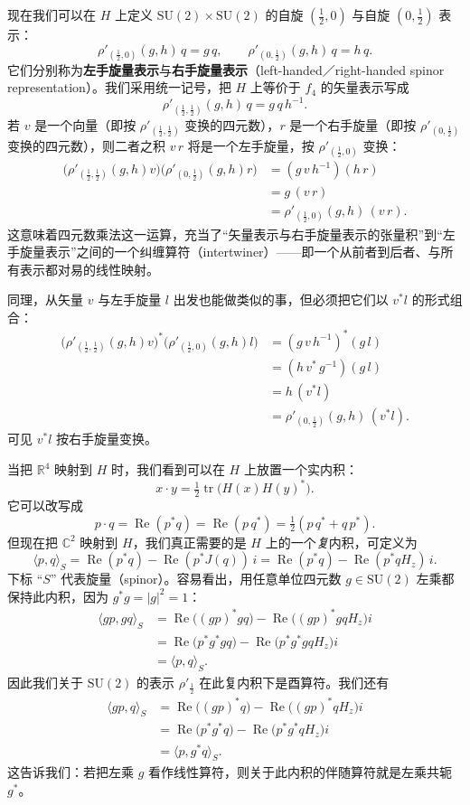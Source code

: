 现在我们可以在 $H$ 上定义 $\mathrm{SU}(2)\times\mathrm{SU}(2)$ 的自旋 $(\tfrac12,0)$ 与自旋 $(0,\tfrac12)$ 表示：
\[
\rho'_{(\frac12,0)}(g,h)\,q=g\,q,\qquad
\rho'_{(0,\frac12)}(g,h)\,q=h\,q .
\]
它们分别称为\textbf{左手旋量表示}与\textbf{右手旋量表示}（left-handed／right-handed spinor representation）。我们采用统一记号，把 $H$ 上等价于 $f_4$ 的矢量表示写成
\[
\rho'_{(\frac12,\frac12)}(g,h)\,q=g\,q\,h^{-1}.
\]
若 $v$ 是一个向量（即按 $\rho'_{(\frac12,\frac12)}$ 变换的四元数），$r$ 是一个右手旋量（即按 $\rho'_{(0,\frac12)}$ 变换的四元数），则二者之积 $v\,r$ 将是一个左手旋量，按 $\rho'_{(\frac12,0)}$ 变换：
\begin{align*}
\big(\rho'_{(\frac12,\frac12)}(g,h)v\big)\big(\rho'_{(0,\frac12)}(g,h)r\big)
&=(g\,v\,h^{-1})(h\,r)\\
&=g\,(v\,r)\\
&=\rho'_{(\frac12,0)}(g,h)\,(v\,r).
\end{align*}
这意味着四元数乘法这一运算，充当了“矢量表示与右手旋量表示的张量积”到“左手旋量表示”之间的一个纠缠算符（intertwiner）——即一个从前者到后者、与所有表示都对易的线性映射。

同理，从矢量 $v$ 与左手旋量 $l$ 出发也能做类似的事，但必须把它们以 $v^* l$ 的形式组合：
\begin{align*}
\big(\rho'_{(\frac12,\frac12)}(g,h)v\big)^*\big(\rho'_{(\frac12,0)}(g,h)l\big)
&=(g\,v\,h^{-1})^*(g\,l)\\
&=(h\,v^*\,g^{-1})(g\,l)\\
&=h\,(v^* l)\\
&=\rho'_{(0,\frac12)}(g,h)\,(v^* l).
\end{align*}
可见 $v^* l$ 按右手旋量变换。

当把 $\mathbb{R}^4$ 映射到 $H$ 时，我们看到可以在 $H$ 上放置一个实内积：
\[
x\cdot y=\tfrac12\operatorname{tr}\!\big(H(x)H(y)^*\big).
\]
它可以改写成
\[
p\cdot q=\operatorname{Re}(p^* q)=\operatorname{Re}(p\,q^*)=\tfrac12(p\,q^*+q\,p^*).
\]
但现在把 $\mathbb{C}^2$ 映射到 $H$，我们真正需要的是 $H$ 上的一个\emph{复}内积，可定义为
\[
\langle p,q\rangle_S=\operatorname{Re}(p^* q)-\operatorname{Re}(p^* J(q))\,i
=\operatorname{Re}(p^* q)-\operatorname{Re}(p^* q H_z)\,i .
\]
下标 “$S$” 代表旋量（spinor）。容易看出，用任意单位四元数 $g\in\mathrm{SU}(2)$ 左乘都保持此内积，因为 $g^* g=|g|^2=1$：
\begin{align*}
\langle gp,gq\rangle_S
&=\operatorname{Re}\big((gp)^* gq\big)-\operatorname{Re}\big((gp)^* gq H_z\big)i\\
&=\operatorname{Re}\big(p^* g^* gq\big)-\operatorname{Re}\big(p^* g^* gq H_z\big)i\\
&=\langle p,q\rangle_S .
\end{align*}
因此我们关于 $\mathrm{SU}(2)$ 的表示 $\rho'_{\frac12}$ 在此复内积下是酉算符。我们还有
\begin{align*}
\langle gp,q\rangle_S
&=\operatorname{Re}\big((gp)^* q\big)-\operatorname{Re}\big((gp)^* q H_z\big)i\\
&=\operatorname{Re}\big(p^* g^* q\big)-\operatorname{Re}\big(p^* g^* q H_z\big)i\\
&=\langle p,g^* q\rangle_S .
\end{align*}
这告诉我们：若把左乘 $g$ 看作线性算符，则关于此内积的伴随算符就是左乘共轭 $g^*$。


